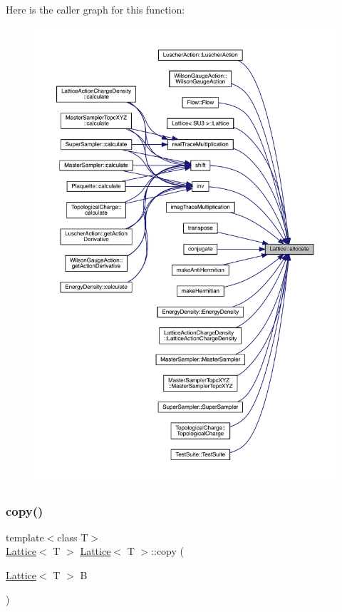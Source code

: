 Here is the caller graph for this function\+:\nopagebreak
\begin{figure}[H]
\begin{center}
\leavevmode
\includegraphics[width=350pt]{class_lattice_a5b4e162f06f7b4b90b4a9335ed2aabb5_icgraph}
\end{center}
\end{figure}
\mbox{\label{class_lattice_a85154fbd1b0ae42af329135c6cd11f34}} 
\subsubsection{\texorpdfstring{copy()}{copy()}}
{\footnotesize\ttfamily template$<$class T$>$ \\
\mbox{\hyperlink{class_lattice}{Lattice}}$<$ T $>$ \mbox{\hyperlink{class_lattice}{Lattice}}$<$ T $>$\+::copy (\begin{DoxyParamCaption}\item[{\mbox{\hyperlink{class_lattice}{Lattice}}$<$ T $>$}]{B }\end{DoxyParamCaption})\hspace{0.3cm}{\ttfamily [inline]}}

